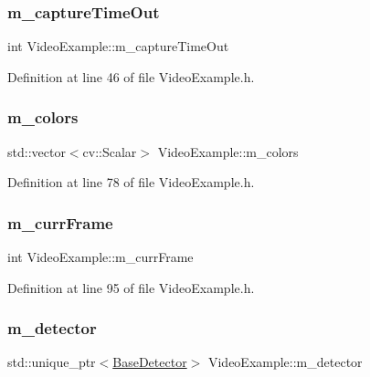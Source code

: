 \subsubsection{\texorpdfstring{m\+\_\+capture\+Time\+Out}{m\_captureTimeOut}}
{\footnotesize\ttfamily int Video\+Example\+::m\+\_\+capture\+Time\+Out\hspace{0.3cm}{\ttfamily [protected]}}



Definition at line 46 of file Video\+Example.\+h.

\mbox{\label{class_video_example_a2b6d4a6e85d52d13d8899c57cc6ddc66}} 
\subsubsection{\texorpdfstring{m\+\_\+colors}{m\_colors}}
{\footnotesize\ttfamily std\+::vector$<$cv\+::\+Scalar$>$ Video\+Example\+::m\+\_\+colors\hspace{0.3cm}{\ttfamily [private]}}



Definition at line 78 of file Video\+Example.\+h.

\mbox{\label{class_video_example_a4adccbe4084f68f10d966901b168a98a}} 
\subsubsection{\texorpdfstring{m\+\_\+curr\+Frame}{m\_currFrame}}
{\footnotesize\ttfamily int Video\+Example\+::m\+\_\+curr\+Frame\hspace{0.3cm}{\ttfamily [private]}}



Definition at line 95 of file Video\+Example.\+h.

\mbox{\label{class_video_example_a00fee4b18b68d605b87051f3bdaa1c92}} 
\subsubsection{\texorpdfstring{m\+\_\+detector}{m\_detector}}
{\footnotesize\ttfamily std\+::unique\+\_\+ptr$<$\mbox{\hyperlink{class_base_detector}{Base\+Detector}}$>$ Video\+Example\+::m\+\_\+detector\hspace{0.3cm}{\ttfamily [protected]}}



